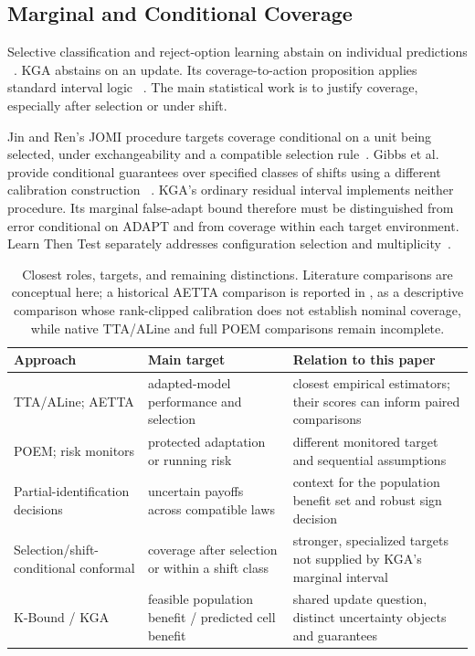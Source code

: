 \subsection{Marginal and Conditional Coverage}

Selective classification and reject-option learning abstain on individual predictions
~\cite{geifman2017selective,chow1970reject,cortes2016boosting}. KGA abstains on an update.
Its coverage-to-action proposition applies standard interval logic
~\cite{tibshirani2019conformal,barber2023beyond,bates2021rcps,angelopoulos2025ltt}.
The main statistical work is to justify coverage, especially after selection or under shift.

Jin and Ren's JOMI procedure targets coverage conditional on a unit being selected, under
exchangeability and a compatible selection rule~\cite{jin2025selection}. Gibbs et al. provide
conditional guarantees over specified classes of shifts using a different calibration construction
~\cite{gibbs2025conditional}. KGA's ordinary residual interval implements neither procedure.
Its marginal false-adapt bound therefore must be distinguished from error conditional on ADAPT
and from coverage within each target environment. Learn Then Test separately addresses
configuration selection and multiplicity~\cite{angelopoulos2025ltt}.

\begin{table}[t]
\centering
\footnotesize
\caption{Closest roles, targets, and remaining distinctions. Literature comparisons are conceptual here;
a historical AETTA comparison is reported in , as a descriptive comparison whose rank-clipped calibration does not establish nominal coverage, while native TTA/ALine and full POEM comparisons remain incomplete.}
\label{tab:related-comparison}
\begin{tabular}{@{}p{}p{}p{}@{}}
\toprule
Approach & Main target & Relation to this paper \\
\midrule
TTA/ALine; AETTA & adapted-model performance and selection & closest empirical estimators; their scores can inform paired comparisons \\
POEM; risk monitors & protected adaptation or running risk & different monitored target and sequential assumptions \\
Partial-identification decisions & uncertain payoffs across compatible laws & context for the population benefit set and robust sign decision \\
Selection/shift-conditional conformal & coverage after selection or within a shift class & stronger, specialized targets not supplied by KGA's marginal interval \\
K-Bound / KGA & feasible population benefit / predicted cell benefit & shared update question, distinct uncertainty objects and guarantees \\
\bottomrule
\end{tabular}
\end{table}

